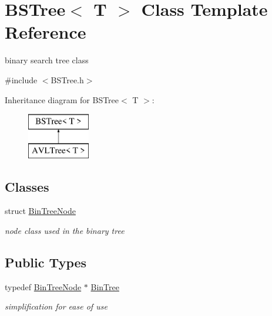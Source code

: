 \hypertarget{classBSTree}{\section{B\-S\-Tree$<$ T $>$ Class Template Reference}
\label{classBSTree}
}


binary search tree class  




{\ttfamily \#include $<$B\-S\-Tree.\-h$>$}

Inheritance diagram for B\-S\-Tree$<$ T $>$\-:\begin{figure}[H]
\begin{center}
\leavevmode
\includegraphics[height=2.000000cm]{classBSTree}
\end{center}
\end{figure}
\subsection*{Classes}
\begin{DoxyCompactItemize}
\item 
struct \hyperlink{structBSTree_1_1BinTreeNode}{Bin\-Tree\-Node}
\begin{DoxyCompactList}\small\item\em node class used in the binary tree \end{DoxyCompactList}\end{DoxyCompactItemize}
\subsection*{Public Types}
\begin{DoxyCompactItemize}
\item 
\hypertarget{classBSTree_ae961195e523a45be64a981840e953b67}{typedef \hyperlink{structBSTree_1_1BinTreeNode}{Bin\-Tree\-Node} $\ast$ \hyperlink{classBSTree_ae961195e523a45be64a981840e953b67}{Bin\-Tree}}\label{classBSTree_ae961195e523a45be64a981840e953b67}

\begin{DoxyCompactList}\small\item\em simplification for ease of use \end{DoxyCompactList}\end{DoxyCompactItemize}
